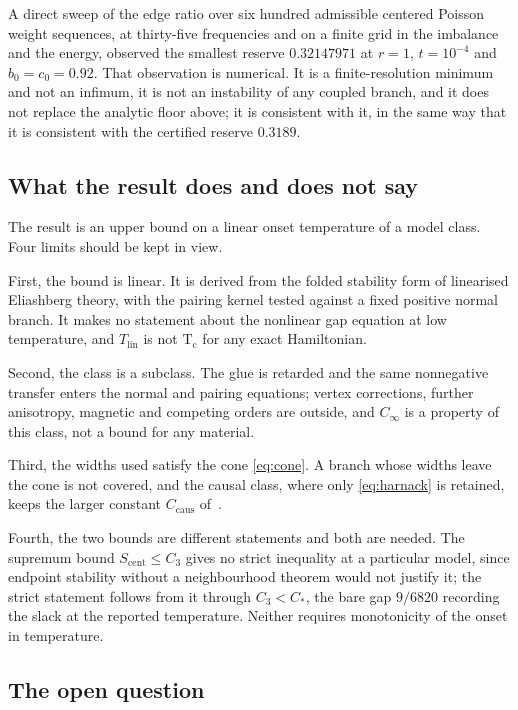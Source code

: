 \documentclass[10pt]{article}
\theoremstyle{remark}
\newcommand{\Tlin}{T_{\mathrm{lin}}}
\newcommand{\Cinf}{C_\infty}
\newcommand{\Ccaus}{C_{\mathrm{caus}}}
\newcommand{\Cstar}{C_{*}}
\newcommand{\Cthree}{C_{3}}
\begin{document}
A direct sweep of the edge ratio over six hundred admissible centered Poisson weight sequences, at thirty-five frequencies and on a finite grid in the imbalance and the energy, observed the smallest reserve $0.32147971$ at $r=1$, $t=10^{-4}$ and $b_0=c_0=0.92$. That observation is numerical. It is a finite-resolution minimum and not an infimum, it is not an instability of any coupled branch, and it does not replace the analytic floor above; it is consistent with it, in the same way that it is consistent with the certified reserve $0.3189$.

\subsection{What the result does and does not say}

The result is an upper bound on a linear onset temperature of a model class. Four limits should be kept in view.

First, the bound is linear. It is derived from the folded stability form of linearised Eliashberg theory, with the pairing kernel tested against a fixed positive normal branch. It makes no statement about the nonlinear gap equation at low temperature, and $\Tlin$ is not $\mathrm{T_c}$ for any exact Hamiltonian.

Second, the class is a subclass. The glue is retarded and the same nonnegative transfer enters the normal and pairing equations; vertex corrections, further anisotropy, magnetic and competing orders are outside, and $\Cinf$ is a property of this class, not a bound for any material.

Third, the widths used satisfy the cone \eqref{eq:cone}. A branch whose widths leave the cone is not covered, and the causal class, where only \eqref{eq:harnack} is retained, keeps the larger constant $\Ccaus$ of~\cite{finiteenergy}.

Fourth, the two bounds are different statements and both are needed. The supremum bound $S_{\mathrm{cent}}\le\Cthree$ gives no strict inequality at a particular model, since endpoint stability without a neighbourhood theorem would not justify it; the strict statement follows from it through $\Cthree<\Cstar$, the bare gap $9/6820$ recording the slack at the reported temperature. Neither requires monotonicity of the onset in temperature.

\subsection{The open question}
\end{document}
